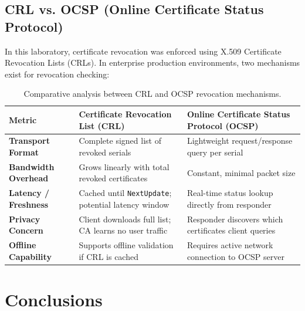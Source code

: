 \documentclass[12pt,a4paper]{article}
\begin{document}
\subsection{CRL vs. OCSP (Online Certificate Status Protocol)}
In this laboratory, certificate revocation was enforced using X.509 Certificate Revocation Lists (CRLs). In enterprise production environments, two mechanisms exist for revocation checking:
\begin{table}[h!]
\centering
\caption{Comparative analysis between CRL and OCSP revocation mechanisms.}
\label{tab:crl_vs_ocsp}
\begin{tabularx}{\textwidth}{lXX}
    \toprule
    \textbf{Metric} & \textbf{Certificate Revocation List (CRL)} & \textbf{Online Certificate Status Protocol (OCSP)} \\
    \midrule
    \textbf{Transport Format} & Complete signed list of revoked serials & Lightweight request/response query per serial \\
    \textbf{Bandwidth Overhead} & Grows linearly with total revoked certificates & Constant, minimal packet size \\
    \textbf{Latency / Freshness} & Cached until \texttt{NextUpdate}; potential latency window & Real-time status lookup directly from responder \\
    \textbf{Privacy Concern} & Client downloads full list; CA learns no user traffic & Responder discovers which certificates client queries \\
    \textbf{Offline Capability} & Supports offline validation if CRL is cached & Requires active network connection to OCSP server \\
    \bottomrule
\end{tabularx}
\end{table}

\section{Conclusions}
\end{document}
